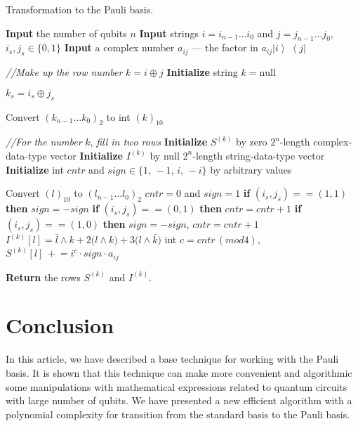 \documentclass[12pt,a4paper,twoside]{article}      %
\newcommand{\ketbra}[2]{{\ensuremath {\left|#1\right\rangle\!\;\!\!\left\langle#2\right|}}}
\begin{document}
\newpage
\begin{algorithm}[H]
	\caption{\;Transformation to the Pauli basis.}
	\label{Alg}
\begin{algorithmic}[1]
\vspace{1ex}
\State \textbf{Input} the number of qubits $n$
\State \textbf{Input} strings $i=i_{n-1}\ldots{}i_0$ and $j=j_{n-1}\ldots{}j_0$,\; $i_s,j_s\in\{0,1\}$
\State \textbf{Input} a complex number $a_{ij}$ --- the factor in $a_{ij}\ketbra{i}{j}$

\State \textit{//Make up the row number} $k=i\oplus{}j$
\State 	\textbf{Initialize} string $k=\mathrm{null}$
	

        \quad\:$k_s=i_s\oplus{}j_s$
    \EndFor
\EndFor

\State 	Convert $(k_{n-1}\ldots{}k_0)_{2}$ to int $(k)_{10}$

\State \textit{//For the number} $k$, \textit{fill in two rows}
\State 	\textbf{Initialize} $S^{(k)}$ by zero $2^n$-length complex-data-type vector
\State 	\textbf{Initialize} $I^{(k)}$ by null $2^n$-length string-data-type vector
\State 	\textbf{Initialize} int $cntr$ and $sign\in\{1,\,-1,\,i,\,-i\}$ by arbitrary values


    \State Convert $(l)_{10}$ to $(l_{n-1}\ldots{}l_0)_{2}$
    \State $cntr=0$\; and\; $sign=1$
            \State \textbf{if} {$(i_s,j_s)==(1,1)$} \textbf{then} {$sign = - sign$}
            \State \textbf{if} {$(i_s,j_s)==(0,1)$}
            \textbf{then} {$cntr = cntr+1$}
            \State \textbf{if} {$(i_s,j_s)==(1,0)$}
            \textbf{then} {$sign = - sign$, \: $cntr = cntr+1$}
        \EndIf
    \EndFor
    \State $I^{(k)}[l]=\bar{l}\wedge{}k+ 2\big(l\wedge{}k\big)+ 3\big(l\wedge{}\bar{k}\big)$
    \State int $c = cntr\, (mod 4)$,\; $S^{(k)}[l]\,+\!=i^c\cdot{}sign\cdot{}a_{ij}$
\EndFor

\State \textbf{Return} the rows $S^{(k)}$ and $I^{(k)}$.
\end{algorithmic}
\end{algorithm}



\section{Conclusion}


In this article, we have described a base technique for working with the Pauli basis. It is shown that this technique can make more convenient and algorithmic some manipulations with mathematical expressions related to quantum circuits with large number of qubits. We have presented a new efficient algorithm with a polynomial complexity for transition from the standard basis to the Pauli basis.
\end{document}

